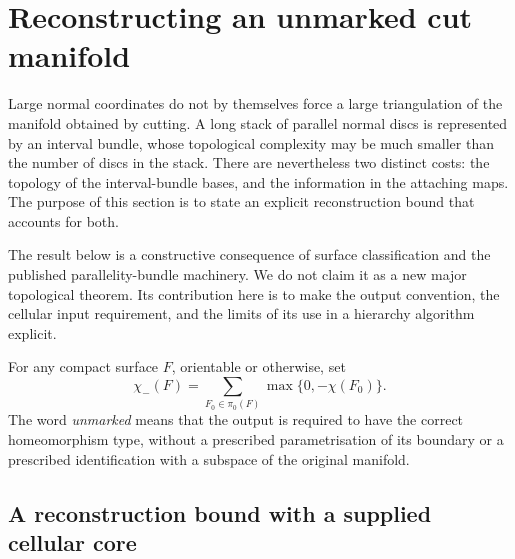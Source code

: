 \section{Reconstructing an unmarked cut manifold}
\label{sec:unmarked-reconstruction}

Large normal coordinates do not by themselves force a large triangulation of
the manifold obtained by cutting.  A long stack of parallel normal discs is
represented by an interval bundle, whose topological complexity may be much
smaller than the number of discs in the stack.  There are nevertheless two
distinct costs: the topology of the interval-bundle bases, and the information
in the attaching maps.  The purpose of this section is to state an explicit
reconstruction bound that accounts for both.

The result below is a constructive consequence of surface classification and
the published parallelity-bundle machinery.  We do not claim it as a new major
topological theorem.  Its contribution here is to make the output convention,
the cellular input requirement, and the limits of its use in a hierarchy
algorithm explicit.

For any compact surface $F$, orientable or otherwise, set
\[
  \chi_-(F)=\sum_{F_0\in\pi_0(F)}\max\{0,-\chi(F_0)\}.
\]
The word \emph{unmarked} means that the output is required to have the correct
homeomorphism type, without a prescribed parametrisation of its boundary or
a prescribed identification with a subspace of the original manifold.

\subsection{A reconstruction bound with a supplied cellular core}


